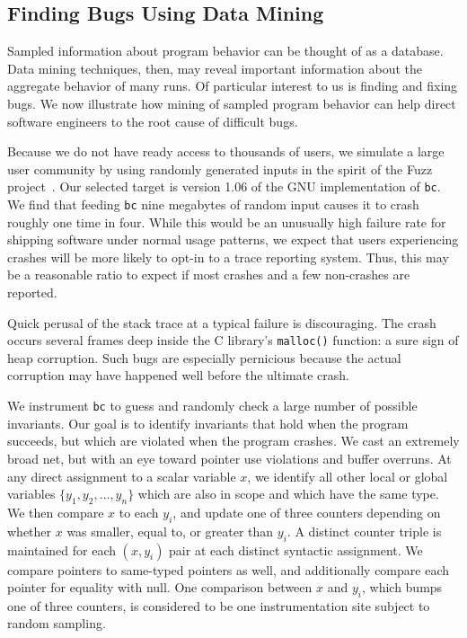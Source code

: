 \subsection{Finding Bugs Using Data Mining}

Sampled information about program behavior can be thought of as a
database.  Data mining techniques, then, may reveal important
information about the aggregate behavior of many runs.  Of particular
interest to us is finding and fixing bugs.  We now illustrate how
mining of sampled program behavior can help direct software engineers
to the root cause of difficult bugs.

Because we do not have ready access to thousands of users, we simulate
a large user community by using randomly generated inputs in the
spirit of the Fuzz project~\cite{MKLMMNS95}.  Our selected target is
version 1.06 of the GNU implementation of \texttt{bc}.  We find that
feeding \texttt{bc} nine megabytes of random input causes it to crash
roughly one time in four.  While this would be an unusually high
failure rate for shipping software under normal usage patterns, we
expect that users experiencing crashes will be more likely to opt-in
to a trace reporting system.  Thus, this may be a reasonable ratio to
expect if most crashes and a few non-crashes are reported.

Quick perusal of the stack trace at a typical failure is discouraging.
The crash occurs several frames deep inside the C library's
\texttt{malloc()} function: a sure sign of heap corruption.  Such bugs
are especially pernicious because the actual corruption may have
happened well before the ultimate crash.  

We instrument \texttt{bc} to guess and randomly check a large number
of possible invariants.  Our goal is to identify invariants that hold
when the program succeeds, but which are violated when the program
crashes.  We cast an extremely broad net, but with an eye toward
pointer use violations and buffer overruns.  At any direct assignment
to a scalar variable $x$, we identify all other local or global
variables $\{ y_1, y_2, \dots, y_n \}$ which are also in scope and
which have the same type.  We then compare $x$ to each $y_i$, and
update one of three counters depending on whether $x$ was smaller,
equal to, or greater than $y_i$.  A distinct counter triple is
maintained for each $(x, y_i)$ pair at each distinct syntactic
assignment.  We compare pointers to same-typed pointers as well, and
additionally compare each pointer for equality with null.  One
comparison between $x$ and $y_i$, which bumps one of three counters,
is considered to be one instrumentation site subject to random
sampling.

